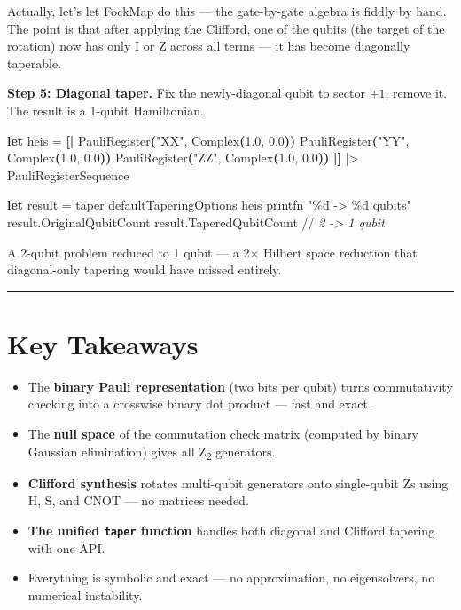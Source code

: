 \documentclass[
  11pt,
  oneside]{book}
\newenvironment{Shaded}{\begin{snugshade}}{\end{snugshade}}
\newcommand{\CommentTok}[1]{\textcolor[rgb]{0.56,0.35,0.01}{\textit{#1}}}
\newcommand{\FloatTok}[1]{\textcolor[rgb]{0.00,0.00,0.81}{#1}}
\newcommand{\KeywordTok}[1]{\textcolor[rgb]{0.13,0.29,0.53}{\textbf{#1}}}
\newcommand{\NormalTok}[1]{#1}
\newcommand{\OperatorTok}[1]{\textcolor[rgb]{0.81,0.36,0.00}{\textbf{#1}}}
\newcommand{\StringTok}[1]{\textcolor[rgb]{0.31,0.60,0.02}{#1}}
\providecommand{\tightlist}{%
  \setlength{\itemsep}{0pt}\setlength{\parskip}{0pt}}
\begin{document}
Actually, let's let FockMap do this --- the gate-by-gate algebra is
fiddly by hand. The point is that after applying the Clifford, one of
the qubits (the target of the rotation) now has only I or Z across all
terms --- it has become diagonally taperable.

\textbf{Step 5: Diagonal taper.} Fix the newly-diagonal qubit to sector
\(+1\), remove it. The result is a 1-qubit Hamiltonian.

\begin{Shaded}
\begin{Highlighting}[]
\KeywordTok{let}\NormalTok{ heis =}
    \OperatorTok{[|}\NormalTok{ PauliRegister}\OperatorTok{(}\StringTok{"XX"}\NormalTok{, Complex}\OperatorTok{(}\FloatTok{1.0}\NormalTok{, }\FloatTok{0.0}\OperatorTok{))}
\NormalTok{       PauliRegister}\OperatorTok{(}\StringTok{"YY"}\NormalTok{, Complex}\OperatorTok{(}\FloatTok{1.0}\NormalTok{, }\FloatTok{0.0}\OperatorTok{))}
\NormalTok{       PauliRegister}\OperatorTok{(}\StringTok{"ZZ"}\NormalTok{, Complex}\OperatorTok{(}\FloatTok{1.0}\NormalTok{, }\FloatTok{0.0}\OperatorTok{))} \OperatorTok{|]}
\NormalTok{    |\textgreater{} PauliRegisterSequence}

\KeywordTok{let}\NormalTok{ result = taper defaultTaperingOptions heis}
\NormalTok{printfn }\StringTok{"\%d -> \%d qubits"}\NormalTok{ result.OriginalQubitCount result.TaperedQubitCount}
\NormalTok{//}\CommentTok{ 2 -> 1 qubit}
\end{Highlighting}
\end{Shaded}

A 2-qubit problem reduced to 1 qubit --- a 2$\times$ Hilbert space reduction
that diagonal-only tapering would have missed entirely.

\begin{center}\rule{0.5\linewidth}{0.5pt}\end{center}

\section{Key Takeaways}\label{key-takeaways-11}

\begin{itemize}
\tightlist
\item
  The \textbf{binary Pauli representation} (two bits per qubit) turns
  commutativity checking into a crosswise binary dot product --- fast
  and exact.
\item
  The \textbf{null space} of the commutation check matrix (computed by
  binary Gaussian elimination) gives all Z\textsubscript{2} generators.
\item
  \textbf{Clifford synthesis} rotates multi-qubit generators onto
  single-qubit Zs using H, S, and CNOT --- no matrices needed.
\item
  \textbf{The unified \texttt{taper} function} handles both diagonal and
  Clifford tapering with one API.
\item
  Everything is symbolic and exact --- no approximation, no
  eigensolvers, no numerical instability.
\end{itemize}
\end{document}

